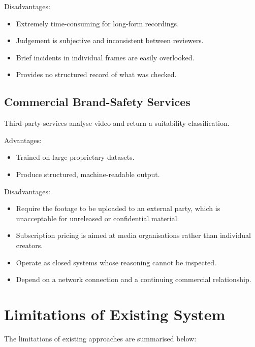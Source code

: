 \documentclass[12pt,a4paper,twoside]{report}
\begin{document}
Disadvantages:

\begin{itemize}
\item Extremely time-consuming for long-form recordings.
\item Judgement is subjective and inconsistent between reviewers.
\item Brief incidents in individual frames are easily overlooked.
\item Provides no structured record of what was checked.
\end{itemize}

\subsection{Commercial Brand-Safety Services}

Third-party services analyse video and return a suitability classification.

Advantages:

\begin{itemize}
\item Trained on large proprietary datasets.
\item Produce structured, machine-readable output.
\end{itemize}

Disadvantages:

\begin{itemize}
\item Require the footage to be uploaded to an external party, which is unacceptable for unreleased or confidential material.
\item Subscription pricing is aimed at media organisations rather than individual creators.
\item Operate as closed systems whose reasoning cannot be inspected.
\item Depend on a network connection and a continuing commercial relationship.
\end{itemize}

\section{Limitations of Existing System}

The limitations of existing approaches are summarised below:
\end{document}
